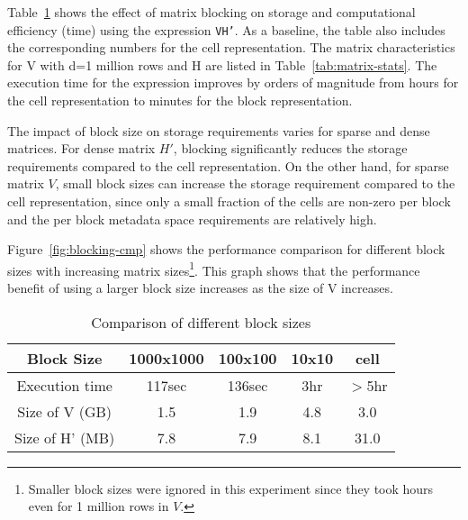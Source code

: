  Table~\ref{tab:cmp-block} shows the effect of matrix blocking
on storage and computational efficiency (time) using the expression \texttt{V\mmult H'}. As a
baseline, the table also includes the corresponding numbers for the cell representation. The matrix
characteristics for V with d=1 million rows and H are listed in Table~\ref{tab:matrix-stats}.  The
execution time for the expression improves by orders of magnitude from hours for the cell
representation to minutes for the block representation. 

The impact of block size on storage requirements varies for sparse and dense matrices. For dense
matrix $H'$, blocking significantly reduces the storage requirements compared to the cell
representation. On the other hand, for sparse matrix $V$, small block sizes can increase the storage
requirement compared to the cell representation, since only a small fraction of the cells are non-zero
per block and the per block metadata space requirements are relatively high.

Figure~\ref{fig:blocking-cmp} shows the performance comparison for different block sizes with increasing matrix
sizes\footnote{Smaller block sizes were ignored in this experiment since they took hours even for 1
  million rows in $V$.}. This graph shows that the performance benefit of using a larger block size
increases as the size of V increases.




\begin{table}[t]
\centering
\caption{Comparison of different block sizes}
\label{tab:cmp-block}
\begin{tabular}{|c|c|c|c|c|}
\hline
Block Size & 1000x1000 & 100x100 & 10x10 & cell\\
\hline
Execution time &117sec & 136sec & 3hr & $>$5hr\\
\hline
Size of V (GB) & 1.5 & 1.9 & 4.8 & 3.0\\
\hline
Size of H' (MB) & 7.8 & 7.9 & 8.1 & 31.0\\
\hline
\end{tabular}
\Crunch
\end{table}

